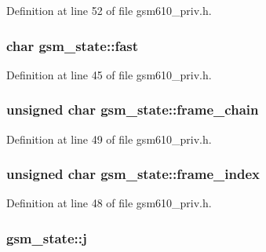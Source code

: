 Definition at line 52 of file gsm610\+\_\+priv.\+h.

\subsubsection[{\texorpdfstring{fast}{fast}}]{\setlength{\rightskip}{0pt plus 5cm}char gsm\+\_\+state\+::fast}\hypertarget{structgsm__state_afda6b3879d77e0128b8bfb47e51aff07}{}\label{structgsm__state_afda6b3879d77e0128b8bfb47e51aff07}


Definition at line 45 of file gsm610\+\_\+priv.\+h.

\subsubsection[{\texorpdfstring{frame\+\_\+chain}{frame_chain}}]{\setlength{\rightskip}{0pt plus 5cm}unsigned char gsm\+\_\+state\+::frame\+\_\+chain}\hypertarget{structgsm__state_a4cb5651ee1229f4261875a295090d437}{}\label{structgsm__state_a4cb5651ee1229f4261875a295090d437}


Definition at line 49 of file gsm610\+\_\+priv.\+h.

\subsubsection[{\texorpdfstring{frame\+\_\+index}{frame_index}}]{\setlength{\rightskip}{0pt plus 5cm}unsigned char gsm\+\_\+state\+::frame\+\_\+index}\hypertarget{structgsm__state_abf7921d89005fd872d12493916f514df}{}\label{structgsm__state_abf7921d89005fd872d12493916f514df}


Definition at line 48 of file gsm610\+\_\+priv.\+h.

\subsubsection[{\texorpdfstring{j}{j}}]{ gsm\+\_\+state\+::j}\hypertarget{structgsm__state_ab65015688378559ca4a31a8b56888e29}{}\label{structgsm__state_ab65015688378559ca4a31a8b56888e29}


